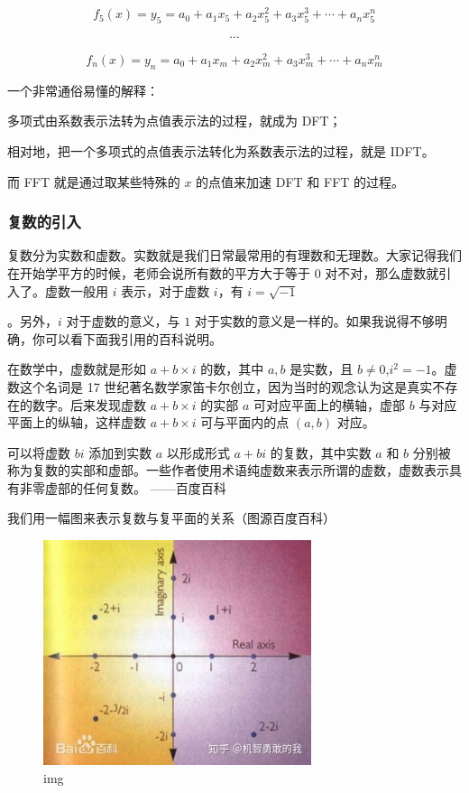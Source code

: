 $$
f_5(x) = y_5 = a_0 + a_1x_5+a_2x_5^2+a_3x_5^3+ \cdots + a_nx_5^n
$$

$$
\cdots
$$

$$
f_n(x) = y_n = a_0 + a_1x_m+a_2x_m^2+a_3x_m^3+ \cdots + a_nx_m^n
$$

一个非常通俗易懂的解释：

多项式由系数表示法转为点值表示法的过程，就成为 DFT；

相对地，把一个多项式的点值表示法转化为系数表示法的过程，就是 IDFT。

而 FFT 就是通过取某些特殊的 $x$ 的点值来加速 DFT 和 FFT 的过程。

\subsubsection{复数的引入}

复数分为实数和虚数。实数就是我们日常最常用的有理数和无理数。大家记得我们在开始学平方的时候，老师会说所有数的平方大于等于 $0$ 对不对，那么虚数就引入了。虚数一般用 $i$ 表示，对于虚数 $i$，有 $i=\sqrt{-1}$

。另外，$i$ 对于虚数的意义，与 $1$ 对于实数的意义是一样的。如果我说得不够明确，你可以看下面我引用的百科说明。

\begin{QUOTE}{}{}
在数学中，虚数就是形如 $a+b \times i$ 的数，其中 $a,b$ 是实数，且 $b \neq 0$,$i^2 = - 1$。虚数这个名词是 17 世纪著名数学家笛卡尔创立，因为当时的观念认为这是真实不存在的数字。后来发现虚数 $a+b \times i$ 的实部 $a$ 可对应平面上的横轴，虚部 $b$ 与对应平面上的纵轴，这样虚数 $a+b \times i$ 可与平面内的点 $(a,b)$ 对应。



可以将虚数 $bi$ 添加到实数 $a$ 以形成形式 $a + bi$ 的复数，其中实数 $a$ 和 $b$ 分别被称为复数的实部和虚部。一些作者使用术语纯虚数来表示所谓的虚数，虚数表示具有非零虚部的任何复数。 ——百度百科
\end{QUOTE}

我们用一幅图来表示复数与复平面的关系（图源百度百科）

\begin{figure}[htbp]
\centering
\includegraphics[width=0.7\textwidth]{docs/math/images/fft1.jpg} 
\caption{img}
\end{figure}


